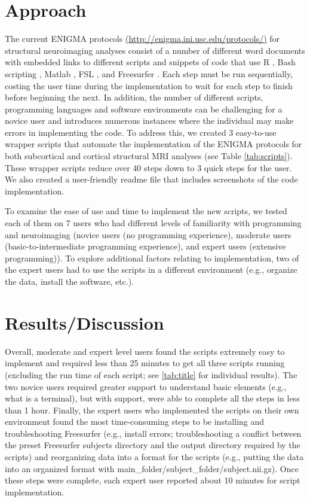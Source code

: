 \documentclass[twocolumn]{bmcart}%
\begin{document}
\section{Approach}\label{approach}

The current ENIGMA protocols \url{(http://enigma.ini.usc.edu/protocols/)} for structural neuroimaging analyses consist of a number of different word documents with embedded links to different scripts and snippets of code that use R \cite{rmanual}, Bash scripting \cite{bashmanual}, Matlab \cite{MATLAB:2010}, FSL \cite{jenkinson2012}, and Freesurfer \cite{fischl2012}. Each step must be run sequentially, costing the user time during the implementation to wait for each step to finish before beginning the next. In addition, the number of different scripts, programming languages and software environments can be challenging for a novice user and introduces numerous instances where the individual may make errors in implementing the code. To address this, we created 3 easy-to-use wrapper scripts that automate the implementation of the ENIGMA protocols for both subcortical and cortical structural MRI analyses (see Table \ref{tab:scripts}). These wrapper scripts reduce over 40 steps down to 3 quick steps for the user. We also created a user-friendly readme file that includes screenshots of the code implementation.

To examine the ease of use and time to implement the new scripts, we tested each of them on 7 users who had different levels of familiarity with programming and neuroimaging (novice users (no programming experience), moderate users (basic-to-intermediate programming experience), and expert users (extensive programming)). To explore additional factors relating to implementation, two of the expert users had to use the scripts in a different environment (e.g., organize the data, install the software, etc.).

\section{Results/Discussion}\label{resultsdiscussion}

Overall, moderate and expert level users found the scripts extremely easy to implement and required less than 25 minutes to get all three scripts running (excluding the run time of each script; see \ref{tab:title} for individual results). The two novice users required greater support to understand basic elements (e.g., what is a terminal), but with support, were able to complete all the steps in less than 1 hour. Finally, the expert users who implemented the scripts on their own environment found the most time-consuming steps to be installing and troubleshooting Freesurfer (e.g., install errors; troubleshooting a conflict between the preset Freesurfer subjects directory and the output directory required by the scripts) and reorganizing data into a format for the scripts (e.g., putting the data into an organized format with main\_folder/subject\_folder/subject.nii.gz). Once these steps were complete, each expert user reported about 10 minutes for script implementation.
\end{document}
